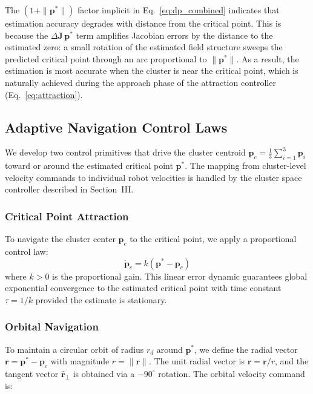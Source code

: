 \documentclass[lettersize,journal]{IEEEtran}
\begin{document}
The $(1+\|\mathbf{p}^*\|)$ factor implicit in Eq.~\eqref{eq:dp_combined} indicates that estimation accuracy degrades with distance from the critical point. This is because the $\Delta\mathbf{J}\,\mathbf{p}^*$ term amplifies Jacobian errors by the distance to the estimated zero: a small rotation of the estimated field structure sweeps the predicted critical point through an arc proportional to $\|\mathbf{p}^*\|$. As a result, the estimation is most accurate when the cluster is near the critical point, which is naturally achieved during the approach phase of the attraction controller (Eq.~\eqref{eq:attraction}).

\subsection{Adaptive Navigation Control Laws}
\label{sec:control_primitives}

We develop two control primitives that drive the cluster centroid $\mathbf{p}_c = \frac{1}{3}\sum_{i=1}^{3}\mathbf{p}_i$ toward or around the estimated critical point $\mathbf{p}^*$. The mapping from cluster-level velocity commands to individual robot velocities is handled by the cluster space controller described in Section~III.

\subsubsection{Critical Point Attraction}
To navigate the cluster center $\mathbf{p}_c$ to the critical point, we apply a proportional control law:
\begin{equation}
\dot{\mathbf{p}}_c = k(\mathbf{p}^* - \mathbf{p}_c)
\end{equation}
where $k > 0$ is the proportional gain. This linear error dynamic guarantees global exponential convergence to the estimated critical point with time constant $\tau = 1/k$ provided the estimate is stationary.

\subsubsection{Orbital Navigation}
To maintain a circular orbit of radius $r_d$ around $\mathbf{p}^*$, we define the radial vector $\mathbf{r} = \mathbf{p}^* - \mathbf{p}_c$ with magnitude $r = \|\mathbf{r}\|$. The unit radial vector is $\hat{\mathbf{r}} = \mathbf{r}/r$, and the tangent vector $\hat{\mathbf{r}}_\perp$ is obtained via a $-90^\circ$ rotation. The orbital velocity command is:
\end{document}
